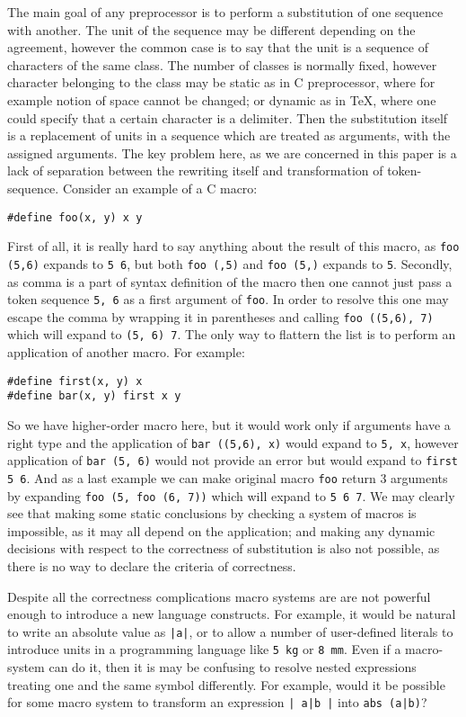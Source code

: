 The main goal of any preprocessor is to perform a substitution of
one sequence with another.  The unit of the sequence may 
be different depending on the agreement, however the common
case is to say that the unit is a sequence of characters of the
same class.  The number of classes is normally fixed, however 
character belonging to the class may be static as in C preprocessor,
where for example notion of space cannot be changed; or dynamic as
in \TeX, where one could specify that a certain character is a 
delimiter.  Then the substitution itself is a replacement of 
units in a sequence which are treated as arguments, with the 
assigned arguments.  The key problem here, as we are concerned
in this paper is a lack of separation between the rewriting itself
and transformation of token-sequence.  Consider an example of
a C macro:
\begin{verbatim}
#define foo(x, y) x y
\end{verbatim}
First of all, it is really hard to say anything about the result
of this macro, as \verb|foo (5,6)| expands to \verb|5 6|, but
both \verb|foo (,5)| and \verb|foo (5,)| expands to \verb|5|.
Secondly, as comma is a part of syntax definition of the macro
then one cannot just pass a token sequence \verb|5, 6| as a
first argument of \verb|foo|.  In order to resolve this one
may escape the comma by wrapping it in parentheses and calling
\verb|foo ((5,6), 7)| which will expand to \verb|(5, 6) 7|.
The only way to flattern the list is to perform an application
of another macro.  For example:
\begin{verbatim}
#define first(x, y) x
#define bar(x, y) first x y
\end{verbatim}
So we have higher-order macro here, but it would work only if
arguments have a right type and the application of 
\verb|bar ((5,6), x)| would expand to \verb|5, x|, however
application of \verb|bar (5, 6)| would not provide an error
but would expand to \verb|first 5 6|.  And as a last example
we can make original macro \verb|foo| return 3 arguments
by expanding \verb|foo (5, foo (6, 7))| which will expand to
\verb|5 6 7|.  We may clearly see that making some static 
conclusions by checking a system of macros is impossible, as
it may all depend on the application; and making any dynamic
decisions with respect to the correctness of substitution is
also not possible, as there is no way to declare the criteria
of correctness.

Despite all the correctness complications macro systems are
are not powerful enough to introduce a new language constructs.
For example, it would be natural to write an absolute value
as \verb/|a|/, or to allow a number of user-defined literals to
introduce units in a programming language like \verb/5 kg/ or
\verb|8 mm|.  Even if a macro-system can do it, then it is
may be confusing to resolve nested expressions treating one
and the same symbol differently.  For example, would it be 
possible for some macro system to transform an expression 
\verb/| a|b |/ into \verb/abs (a|b)/?

